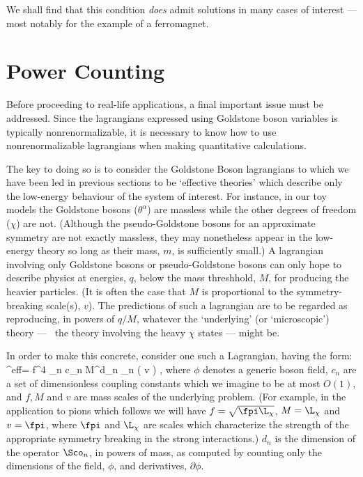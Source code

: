 \documentclass[12pt,epsf]{report}
\def\leff{\Scl^{\rm eff}}
\begin{document}
We shall find that this condition {\em does} admit
solutions in many cases of interest --- most notably for
the example of a ferromagnet.

\section{Power Counting}

Before proceeding to real-life applications, a final
important issue must be addressed.  Since the lagrangians
expressed using Goldstone boson variables is typically
nonrenormalizable, it is necessary to know how to use
nonrenormalizable lagrangians  when making quantitative
calculations. 

The key to doing so is to consider the Goldstone Boson
lagrangians to which we have been led in previous sections
to be `effective theories' which describe only the
low-energy behaviour of the system of interest. For
instance, in our toy models the Goldstone bosons
($\theta^\alpha$) are massless while the other degrees of
freedom ($\chi$) are not. (Although the pseudo-Goldstone
bosons for an approximate symmetry are not exactly
massless, they may nonetheless appear in the low-energy
theory so long as their mass, $m$, is  sufficiently small.)
A lagrangian involving only Goldstone bosons or
pseudo-Goldstone bosons can only hope to describe physics
at energies, $q$, below the mass threshhold, $M$, for
producing the heavier particles. (It is often the case that
$M$  is proportional to the symmetry-breaking scale(s),
$v$). The predictions of such a lagrangian are to be
regarded as reproducing, in powers of $q/M$, whatever the
`underlying' (or `microscopic') theory --- \ie\ the theory
involving the heavy $\chi$ states --- might be.

In order to make this concrete, consider one such a
Lagrangian, having the form:
%
\eq
\label{leffpc}
\leff = f^4 \sum_n {c_n \over M^{d_n}} \; 
\Sco_n \left( {\phi \over v}
\right) ,
\eeq
%
where $\phi$ denotes a generic boson field, $c_n$ are a set
of dimensionless coupling constants which we imagine to be
at most $O(1)$, and $f, M$ and $v$ are mass scales of the
underlying problem. (For example, in the application to
pions which follows we will have $f = \sqrt{\fpi \L_\chi}$,
$M = \L_\chi$ and $v = 
\fpi$, where $\fpi$ and $\L_\chi$ are scales which
characterize the strength of the appropriate symmetry
breaking in the strong interactions.) $d_n$ is the
dimension of the operator $\Sco_n$, in powers of mass, as
computed by counting only the dimensions of the  field,
$\phi$, and derivatives, $\partial\phi$.
\end{document}
